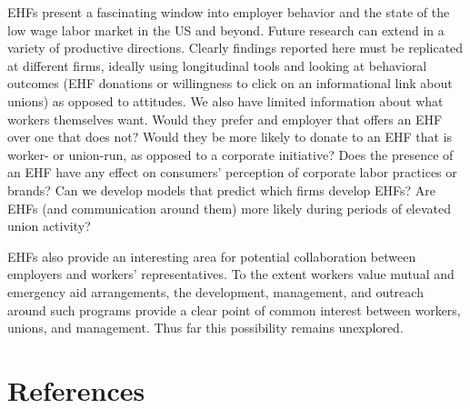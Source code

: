 \documentclass[
  11pt,
  oneside]{article}
\begin{document}
EHFs present a fascinating window into employer behavior and the state of the low wage labor market in the US and beyond. Future research can extend in a variety of productive directions. Clearly findings reported here must be replicated at different firms, ideally using longitudinal tools and looking at behavioral outcomes (EHF donations or willingness to click on an informational link about unions) as opposed to attitudes. We also have limited information about what workers themselves want. Would they prefer and employer that offers an EHF over one that does not? Would they be more likely to donate to an EHF that is worker- or union-run, as opposed to a corporate initiative? Does the presence of an EHF have any effect on consumers' perception of corporate labor practices or brands? Can we develop models that predict which firms develop EHFs? Are EHFs (and communication around them) more likely during periods of elevated union activity?

EHFs also provide an interesting area for potential collaboration between employers and workers' representatives. To the extent workers value mutual and emergency aid arrangements, the development, management, and outreach around such programs provide a clear point of common interest between workers, unions, and management. Thus far this possibility remains unexplored.

\section*{References}\label{references}
\end{document}
